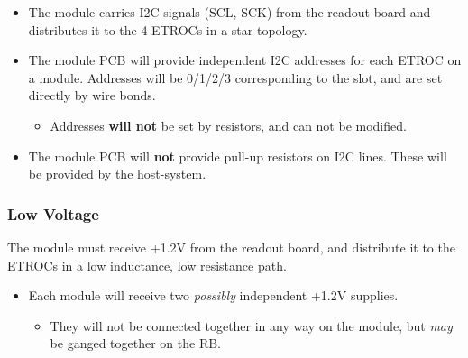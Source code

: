 \documentclass[11pt]{article}
\begin{document}
\begin{itemize}
\item The module carries I2C signals (SCL, SCK) from the readout board and distributes it to the 4 ETROCs in a star topology.
\item The module PCB will provide independent I2C addresses for each ETROC on a module. Addresses will be 0/1/2/3 corresponding to the slot, and are set directly by wire bonds.
\begin{itemize}
\item Addresses \textbf{will not} be set by resistors, and can not be modified.
\end{itemize}
\item The module PCB will \textbf{not} provide pull-up resistors on I2C lines. These will be provided by the host-system.
\end{itemize}

\subsubsection{Low Voltage}
\label{sec:org12cc19b}

The module must receive +1.2V from the readout board, and distribute it to the ETROCs in a low inductance, low resistance path.

\begin{itemize}
\item Each module will receive two \emph{possibly} independent +1.2V supplies.
\begin{itemize}
\item They will not be connected together in any way on the module, but \emph{may} be ganged together on the RB.
\end{itemize}
\end{itemize}
\end{document}
